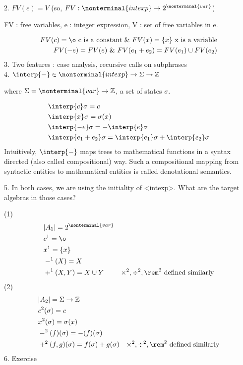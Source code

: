 \documentclass{report}[12pt]
\begin{document}
2. $FV(e) = V$ (so, $FV:\nonterminal{intexp} \rightarrow 2^{\nonterminal{var}}$)

FV : free variables, e : integer expression, V : set of free variables in e.

\begin{align*}
    FV(c) = \o \text{ c is a constant}\ \char`\&\ FV(x) = \{x\} \text{ x is a variable}\\
    FV(-e) = FV(e)\ \char`\&\ FV(e_1 + e_2) = FV(e_1) \cup FV(e_2)
\end{align*}
3. Two features : case analysis, recursive calls on subphrases\\
4. $\interp{ - } \in \nonterminal{intexp} \rightarrow \Sigma \rightarrow \mathbb{Z}$

where $\Sigma = \nonterminal{var} \rightarrow \mathbb{Z}$, a set of states $\sigma$.

\begin{align*}
    &\interp{ c } \sigma = c \\
    &\interp{ x } \sigma = \sigma(x) \\
    &\interp{ -e } \sigma = - \interp{ e } \sigma \\
    &\interp{ e_1 + e_2 } \sigma = \interp{ e_1 } \sigma + \interp{ e_2 } \sigma
\end{align*}
Intuitively, $\interp{ - }$ maps trees to mathematical functions in a syntax directed (also called compositional) way. Such a compositional mapping from syntactic entities to mathematical entities is called denotational semantics.

5. In both cases, we are using the initiality of <intexp>. What are the target algebras in those cases?

(1) \begin{align*}
    &|A_1| = 2^{\nonterminal{var}} \\
    &c^1 = \o \\
    &x^1 = \{x\}\\
    &-^1 (X) = X \\
    &+^1 (X, Y) = X\cup Y & \times^2, \div^2, \rem^2 \text{ defined similarly}
\end{align*}
(2)
\begin{align*}
    &|A_2| = \Sigma \rightarrow \mathbb{Z} \\
    &c^2 (\sigma) = c\\
    &x^2 (\sigma) = \sigma(x) \\
    &-^2 (f)(\sigma) = -(f)(\sigma) \\
    &+^2 (f, g)(\sigma) = f(\sigma) + g(\sigma) & \times^2, \div^2, \rem^2 \text{ defined similarly}
\end{align*}
6. Exercise
\end{document}
